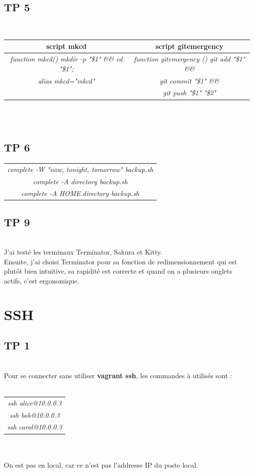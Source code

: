 \documentclass{report}
\begin{document}
\section{TP 5}
\\
\begin{tabular}{|c|c|}
\hline
\textbf{script mkcd} & \textbf{script gitemergency}\\
\hline
\textit{function mkcd() mkdir -p "\$1" \&\& cd "\$1";} & 
\textit{function gitemergency () git add "\$1" \&\&}\\
\textit{alias mkcd="mkcd"} & \textit{git commit "\$1" \&\&} \\
& \textit{git push "\$1" "\$2"}\\
\hline
\end{tabular}
\\ 
\\
\section{TP 6}
\begin{tabular}{|c|}
\hline
\textit{complete -W "now, tonight, tomorrow" backup.sh}\\
\textit{complete -A directory backup.sh}\\
\textit{complete -A HOME.directory backup.sh}\\
\hline
\end{tabular}
\section{TP 9}
\\
J'ai testé les terminaux Terminator, Sakura et Kitty. 
\\
Ensuite, j'ai choisi Terminator pour sa fonction de redimensionnement qui
est plutôt bien intuitive, sa rapidité est correcte et quand on a plusieurs 
onglets actifs, c'est ergonomique.   
\\
\chapter{SSH}

\section{TP 1}
\\
Pour se connecter sans utiliser \textbf{vagrant ssh}, les commandes à utilisés sont : \\
\\
\begin{tabular}{|c|}
\hline
\textit{ssh alice@10.0.0.3} \\
\textit{ssh bob@10.0.0.3} \\
\textit{ssh carol@10.0.0.3} \\
\hline
\end{tabular}
\\
\\
On est pas en local, car ce n'est pas l'addresse IP du poste local.
\end{document}
